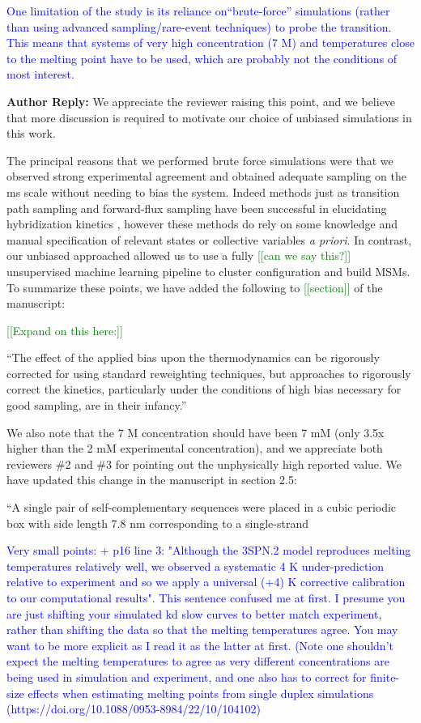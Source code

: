 \documentclass[11pt,a4paper]{letter} %
\newcommand*{\rood}[1]{{\color{red}{#1}}}
\newcommand*{\noteg}[1]{\textcolor{green}{[[#1]]}}		%
\begin{document}
\textcolor{blue}{One limitation of the study is its reliance on``brute-force'' simulations (rather than using advanced sampling/rare-event techniques) to probe the transition. This means that systems of very high concentration (7 M) and temperatures close to the melting point have to be used, which are probably not the conditions of most interest.}

\textbf{Author Reply:}    We appreciate the reviewer raising this point, and we believe that more discussion is required to motivate our choice of unbiased simulations in this work. 

The principal reasons that we performed brute force simulations were that we observed strong experimental agreement and obtained adequate sampling on the ms scale without needing to bias the system.  Indeed methods just as transition path sampling and forward-flux sampling have been successful in elucidating hybridization kinetics \citep{Sambriski2009, Hinckley2014Coarse-grainedEffects, Jin2019}, however these methods do rely on some knowledge and manual specification of relevant states or collective variables \emph{a priori}. In contrast, our unbiased approached allowed us to use a fully \noteg{can we say this?} unsupervised machine learning pipeline to cluster configuration and build MSMs. To summarize these points, we have added the following to \noteg{section} of the manuscript:

\noteg{Expand on this here:}

``The effect of the applied bias upon the thermodynamics can be rigorously corrected for using standard reweighting techniques, but approaches to rigorously correct the kinetics, particularly under the conditions of high bias necessary for good sampling, are in their infancy.''

We also note that the 7 M concentration should have been 7 mM (only 3.5x higher than the 2 mM experimental concentration), and we appreciate both reviewers \#2 and \#3 for pointing out the unphysically high reported value. We have updated this change in the manuscript in section 2.5:

``A single pair of self-complementary sequences were placed in a cubic periodic box with side length 7.8 nm corresponding to a single-strand \rood{concentration of 7 mMol/L.''}

\textcolor{blue}{Very small points:
+ p16 line 3: "Although the 3SPN.2 model reproduces melting temperatures relatively well, we observed a systematic 4 K under-prediction relative to experiment and so we apply a universal (+4) K corrective calibration to our computational results". This sentence confused me at first. I presume you are just shifting your simulated kd slow curves to better match experiment, rather than shifting the data so that the melting temperatures agree. You may want to be more explicit as I read it as the latter at first. (Note one shouldn't expect the melting temperatures to agree as very different concentrations are being used in simulation and experiment, and one also has to correct for finite-size effects when estimating melting points from single duplex simulations (https://doi.org/10.1088/0953-8984/22/10/104102)}
\end{document}
